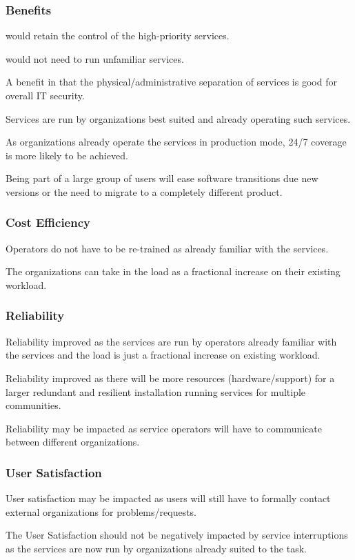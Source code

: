 \documentclass[12pt,a4paper]{article}
\begin{document}
\subsubsection*{Benefits}
\bitm
  \item {\EC would retain the control of the high-priority services.}
  \item {\EC would not need to run unfamiliar services.}
  \item {A benefit in that the physical/administrative separation of services is good for overall IT security.}
  \item Services are run by organizations best suited and already operating such services.
  \item As organizations already operate the services in production mode, 24/7 coverage is more likely to be achieved.
  \item Being part of a large group of users will ease software transitions due new versions or the need to migrate to a completely different product.
\eitm

\subsubsection*{Cost Efficiency}
\bitm
\item Operators do not have to be re-trained as already familiar with the services.
\item The organizations can take in the \ED load as a fractional increase on their existing workload.
\eitm

\subsubsection*{Reliability}
\bitm
\item Reliability improved as the services are run by operators already familiar with the services and the \ED load is just a fractional increase on existing workload.
\item {Reliability improved as there will be more resources (hardware/support) for a larger redundant and resilient \einfra installation running services for multiple communities.}
\item {Reliability may be impacted as service operators will have to communicate between different organizations.}
\eitm

\subsubsection*{User Satisfaction}
\bitm
\item User satisfaction may be impacted as \EC users will still have to formally contact external organizations for problems/requests.
\item The User Satisfaction should not be negatively impacted by service interruptions as the services are now run by organizations already suited to the task.
\eitm
  
\end{document}
